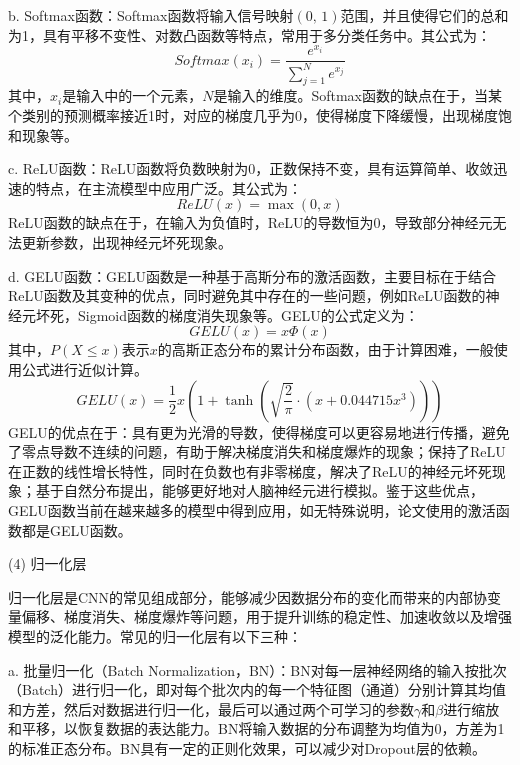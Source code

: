 b. Softmax函数：Softmax函数将输入信号映射\((0,\,1)\)范围，并且使得它们的总和为1，具有平移不变性、对数凸函数等特点，常用于多分类任务中。其公式为：
\begin{equation}
    Softmax(x_i) = \frac{e^{x_i}}{\sum_{j=1}^{N} e^{x_j}}
    \label{eq:softmax}
\end{equation}
其中，\(x_i\)是输入中的一个元素，\(N\)是输入的维度。Softmax函数的缺点在于，当某个类别的预测概率接近1时，对应的梯度几乎为0，使得梯度下降缓慢，出现梯度饱和现象等。

c. ReLU函数\cite{glorot2011proceedings}：ReLU函数将负数映射为0，正数保持不变，具有运算简单、收敛迅速的特点，在主流模型中应用广泛。其公式为：
\begin{equation}
    ReLU(x) = \max(0, x)
    \label{eq:relu}
\end{equation}
ReLU函数的缺点在于，在输入为负值时，ReLU的导数恒为0，导致部分神经元无法更新参数，出现神经元坏死现象。

d. GELU函数\cite{hendrycks2016gaussian}：GELU函数是一种基于高斯分布的激活函数，主要目标在于结合ReLU函数及其变种的优点，同时避免其中存在的一些问题，例如ReLU函数的神经元坏死，Sigmoid函数的梯度消失现象等。GELU的公式定义为：
\begin{equation}
    GELU(x) = x\Phi(x)
    \label{eq:gelu1}
\end{equation}
其中，\(P(X \le x)\)表示\(x\)的高斯正态分布的累计分布函数，由于计算困难，一般使用公式进行近似计算。
\begin{equation}
    GELU(x) = \frac{1}{2}x\left(1 + \tanh\left(\sqrt{\frac{2}{\pi}} \cdot \left(x + 0.044715x^3\right)\right)\right)
    \label{eq:gelu2}
\end{equation}
GELU的优点在于：具有更为光滑的导数，使得梯度可以更容易地进行传播，避免了零点导数不连续的问题，有助于解决梯度消失和梯度爆炸的现象；保持了ReLU在正数的线性增长特性，同时在负数也有非零梯度，解决了ReLU的神经元坏死现象；基于自然分布提出，能够更好地对人脑神经元进行模拟。鉴于这些优点，GELU函数当前在越来越多的模型中得到应用，如无特殊说明，论文使用的激活函数都是GELU函数。

(4) 归一化层

归一化层是CNN的常见组成部分，能够减少因数据分布的变化而带来的内部协变量偏移、梯度消失、梯度爆炸等问题，用于提升训练的稳定性、加速收敛以及增强模型的泛化能力。常见的归一化层有以下三种：

a. 批量归一化（Batch Normalization，BN）：BN对每一层神经网络的输入按批次（Batch）进行归一化，即对每个批次内的每一个特征图（通道）分别计算其均值和方差，然后对数据进行归一化，最后可以通过两个可学习的参数\(\gamma\)和\(\beta\)进行缩放和平移，以恢复数据的表达能力。BN将输入数据的分布调整为均值为0，方差为1的标准正态分布。BN具有一定的正则化效果，可以减少对Dropout层的依赖。

